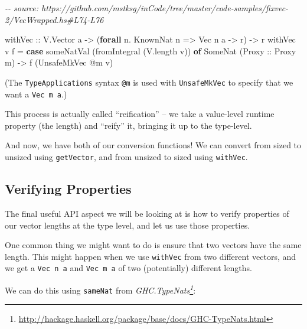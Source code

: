 \documentclass[]{article}
\newenvironment{Shaded}{}{}
\newcommand{\CommentTok}[1]{\textcolor[rgb]{0.38,0.63,0.69}{\textit{#1}}}
\newcommand{\DataTypeTok}[1]{\textcolor[rgb]{0.56,0.13,0.00}{#1}}
\newcommand{\FunctionTok}[1]{\textcolor[rgb]{0.02,0.16,0.49}{#1}}
\newcommand{\KeywordTok}[1]{\textcolor[rgb]{0.00,0.44,0.13}{\textbf{#1}}}
\newcommand{\NormalTok}[1]{#1}
\newcommand{\OperatorTok}[1]{\textcolor[rgb]{0.40,0.40,0.40}{#1}}
\newcommand{\OtherTok}[1]{\textcolor[rgb]{0.00,0.44,0.13}{#1}}
\renewcommand{\href}[2]{#2\footnote{\url{#1}}}
\begin{document}
\begin{Shaded}
\begin{Highlighting}[]
\CommentTok{{-}{-} source: https://github.com/mstksg/inCode/tree/master/code{-}samples/fixvec{-}2/VecWrapped.hs\#L74{-}L76}

\OtherTok{withVec ::} \DataTypeTok{V.Vector}\NormalTok{ a }\OtherTok{{-}\textgreater{}}\NormalTok{ (}\KeywordTok{forall}\NormalTok{ n}\OperatorTok{.} \DataTypeTok{KnownNat}\NormalTok{ n }\OtherTok{=\textgreater{}} \DataTypeTok{Vec}\NormalTok{ n a }\OtherTok{{-}\textgreater{}}\NormalTok{ r) }\OtherTok{{-}\textgreater{}}\NormalTok{ r}
\NormalTok{withVec v f }\OtherTok{=} \KeywordTok{case}\NormalTok{ someNatVal (}\FunctionTok{fromIntegral}\NormalTok{ (V.length v)) }\KeywordTok{of}
    \DataTypeTok{SomeNat}\NormalTok{ (}\DataTypeTok{Proxy}\OtherTok{ ::} \DataTypeTok{Proxy}\NormalTok{ m) }\OtherTok{{-}\textgreater{}}\NormalTok{ f (}\DataTypeTok{UnsafeMkVec} \OperatorTok{@}\NormalTok{m v)}
\end{Highlighting}
\end{Shaded}

(The \texttt{TypeApplications} syntax \texttt{@m} is used with
\texttt{UnsafeMkVec} to specify that we want a \texttt{Vec\ m\ a}.)

This process is actually called ``reification'' -- we take a value-level runtime
property (the length) and ``reify'' it, bringing it up to the type-level.

And now, we have both of our conversion functions! We can convert from sized to
unsized using \texttt{getVector}, and from unsized to sized using
\texttt{withVec}.

\subsection{Verifying Properties}\label{verifying-properties}

The final useful API aspect we will be looking at is how to verify properties of
our vector lengths at the type level, and let us use those properties.

One common thing we might want to do is ensure that two vectors have the same
length. This might happen when we use \texttt{withVec} from two different
vectors, and we get a \texttt{Vec\ n\ a} and \texttt{Vec\ m\ a} of two
(potentially) different lengths.

We can do this using \texttt{sameNat} from
\emph{\href{http://hackage.haskell.org/package/base/docs/GHC-TypeNats.html}{GHC.TypeNats}}:
\end{document}
